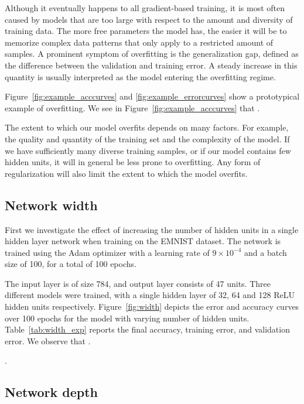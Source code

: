 \documentclass{article}
\begin{document}
Although it eventually happens to all gradient-based training, it is most often caused by models that are too large with respect to the amount and diversity of training data. The more free parameters the model has, the easier it will be to memorize complex data patterns that only apply to a restricted amount of samples.
A prominent symptom of overfitting is the generalization gap, defined as the difference between the validation and training error. 
A steady increase in this quantity is usually interpreted as the model entering the overfitting regime.


Figure~\ref{fig:example_acccurves} and \ref{fig:example_errorcurves} show a prototypical example of overfitting.
We see in Figure~\ref{fig:example_acccurves} that \questionOne.

The extent to which our model overfits depends on many factors.
For example, the quality and quantity of the training set and the complexity of the model. 
If we have sufficiently many diverse training samples, or if our model contains few hidden units, it will in general be less prone to overfitting. 
Any form of regularization will also limit the extent to which the model overfits.


\subsection{Network width}


First we investigate the effect of increasing the number of hidden units in a single hidden layer network when training on the EMNIST dataset.
The network is trained using the Adam optimizer
with a learning rate of $9 \times 10^{-4}$ and a batch size of 100, for a total of 100 epochs.

The input layer is of size 784, and output layer consists of 47 units. 
Three different models were trained, with a single hidden layer of 32, 64 and 128 ReLU hidden units respectively.
Figure~\ref{fig:width} depicts the error and accuracy curves over 100 epochs for the model with varying number of hidden units.
Table~\ref{tab:width_exp} reports the final accuracy, training error, and validation error.
We observe that \questionTwo.

\questionThree.


\subsection{Network depth}
\end{document}
